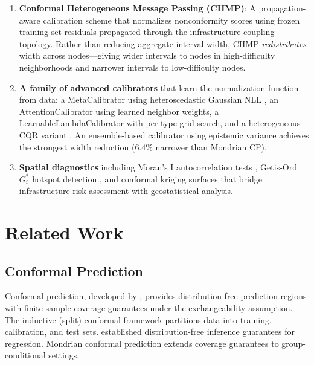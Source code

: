 \documentclass[twoside,11pt]{article}
\begin{document}
\begin{enumerate}
\item \textbf{Conformal Heterogeneous Message Passing (CHMP)}: A
propagation-aware calibration scheme that normalizes nonconformity scores using
frozen training-set residuals propagated through the infrastructure coupling
topology. Rather than reducing aggregate interval width, CHMP
\emph{redistributes} width across nodes---giving wider intervals to nodes in
high-difficulty neighborhoods and narrower intervals to low-difficulty nodes.

\item \textbf{A family of advanced calibrators} that learn the normalization
function from data: a MetaCalibrator using heteroscedastic Gaussian NLL
\citep{kendall2017uncertainties}, an AttentionCalibrator using learned neighbor
weights, a LearnableLambdaCalibrator with per-type grid-search, and a
heterogeneous CQR variant \citep{romano2019conformalized}. An ensemble-based
calibrator using epistemic variance \citep{lakshminarayanan2017simple} achieves
the strongest width reduction ($6.4\%$ narrower than Mondrian CP).

\item \textbf{Spatial diagnostics} including Moran's I autocorrelation tests
\citep{moran1950notes}, Getis-Ord $G_i^*$ hotspot detection
\citep{getis1992analysis}, and conformal kriging surfaces \citep{cressie1993statistics}
that bridge infrastructure risk assessment with geostatistical analysis.
\end{enumerate}

\section{Related Work}
\label{sec:related}

\subsection{Conformal Prediction}

Conformal prediction, developed by \citet{vovk2005algorithmic}, provides
distribution-free prediction regions with finite-sample coverage guarantees under
the exchangeability assumption. The inductive (split) conformal framework
\citep{papadopoulos2002inductive} partitions data into training, calibration,
and test sets. \citet{lei2018distribution} established distribution-free
inference guarantees for regression. Mondrian conformal prediction
\citep{vovk2012conditional} extends coverage guarantees to group-conditional
settings.
\end{document}
